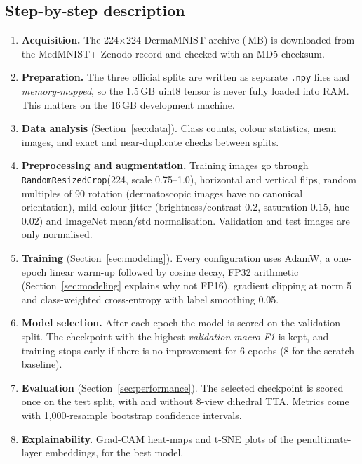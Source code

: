 \subsection{Step-by-step description}
\begin{enumerate}[leftmargin=1.4em]
  \item \textbf{Acquisition.} The 224$\times$224 DermaMNIST archive (\DatasetSizeMB\,MB) is downloaded from the
        MedMNIST+ Zenodo record and checked with an MD5 checksum.
  \item \textbf{Preparation.} The three official splits are written as separate \texttt{.npy} files and
        \emph{memory-mapped}, so the 1.5\,GB uint8 tensor is never fully loaded into RAM. This matters on the
        16\,GB development machine.
  \item \textbf{Data analysis} (Section~\ref{sec:data}). Class counts, colour statistics, mean images, and
        exact and near-duplicate checks between splits.
  \item \textbf{Preprocessing and augmentation.} Training images go through
        \texttt{RandomResizedCrop}(224, scale 0.75--1.0), horizontal and vertical flips, random multiples of
        90\textdegree{} rotation (dermatoscopic images have no canonical orientation), mild colour jitter
        (brightness/contrast 0.2, saturation 0.15, hue 0.02) and ImageNet mean/std normalisation. Validation and
        test images are only normalised.
  \item \textbf{Training} (Section~\ref{sec:modeling}). Every configuration uses AdamW, a one-epoch linear
        warm-up followed by cosine decay, FP32 arithmetic (Section~\ref{sec:modeling} explains why not FP16), gradient
        clipping at norm 5 and class-weighted cross-entropy with label smoothing 0.05.
  \item \textbf{Model selection.} After each epoch the model is scored on the validation split. The checkpoint
        with the highest \emph{validation macro-F1} is kept, and training stops early if there is no improvement
        for 6 epochs (8 for the scratch baseline).
  \item \textbf{Evaluation} (Section~\ref{sec:performance}). The selected checkpoint is scored once on the test
        split, with and without 8-view dihedral TTA. Metrics come with 1{,}000-resample bootstrap confidence
        intervals.
  \item \textbf{Explainability.} Grad-CAM heat-maps and t-SNE plots of the penultimate-layer embeddings, for the
        best model.
\end{enumerate}

